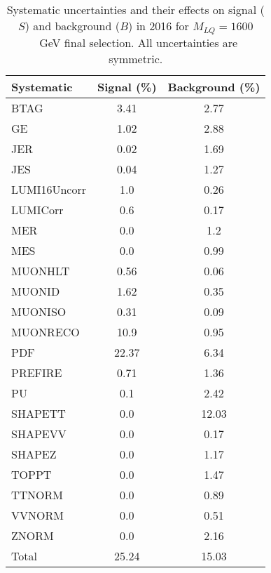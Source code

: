 \begin{table}[htbp]
\begin{center}
\caption{Systematic uncertainties and their effects on signal ($S$) and background ($B$) in 2016 for $M_{LQ}=1600$~GeV final selection. All uncertainties are symmetric.}
\begin{tabular}{lcc}
\hline\hline
Systematic & Signal (\%) & Background (\%) \\ \hline 
BTAG & 3.41 & 2.77\\ 
GE & 1.02 & 2.88\\ 
JER & 0.02 & 1.69\\ 
JES & 0.04 & 1.27\\ 
LUMI16Uncorr & 1.0 & 0.26\\ 
LUMICorr & 0.6 & 0.17\\ 
MER & 0.0 & 1.2\\ 
MES & 0.0 & 0.99\\ 
MUONHLT & 0.56 & 0.06\\ 
MUONID & 1.62 & 0.35\\ 
MUONISO & 0.31 & 0.09\\ 
MUONRECO & 10.9 & 0.95\\ 
PDF & 22.37 & 6.34\\ 
PREFIRE & 0.71 & 1.36\\ 
PU & 0.1 & 2.42\\ 
SHAPETT & 0.0 & 12.03\\ 
SHAPEVV & 0.0 & 0.17\\ 
SHAPEZ & 0.0 & 1.17\\ 
TOPPT & 0.0 & 1.47\\ 
TTNORM & 0.0 & 0.89\\ 
VVNORM & 0.0 & 0.51\\ 
ZNORM & 0.0 & 2.16\\ 
Total & 25.24 & 15.03\\ \hline \hline
\end{tabular}
\label{tab:SysUncertainties_uujj_1600}
\end{center}
\end{table}

